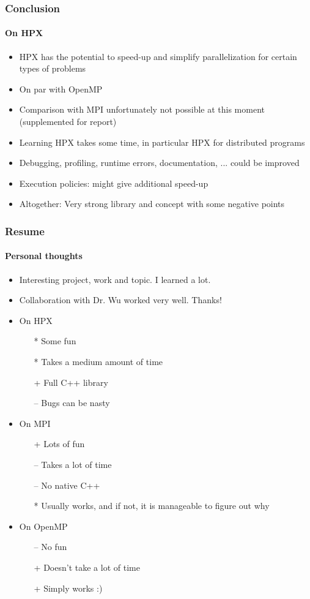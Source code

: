 \begin{frame}
\frametitle{Conclusion}
\framesubtitle{On HPX}
\begin{itemize}
 \item HPX has the potential to speed-up and simplify parallelization for certain types of problems
 \item On par with OpenMP
 \item Comparison with MPI unfortunately not possible at this moment (supplemented for report)
 \item Learning HPX takes some time, in particular HPX for distributed programs
 \item Debugging, profiling, runtime errors, documentation, ...  could be improved
 \item Execution policies: might give additional speed-up
 \item Altogether: Very strong library and concept with some negative points
\end{itemize}
\end{frame}

\begin{frame}
\frametitle{Resume}
\framesubtitle{Personal thoughts}
\begin{itemize}
 \item Interesting project, work and topic. I learned a lot.
 \item Collaboration with Dr. Wu worked very well. Thanks!
 \item On HPX
       \begin{itemize}
        \item[*] Some fun
        \item[*] Takes a medium amount of time
        \item[+] Full C++ library
        \item[--] Bugs can be nasty
       \end{itemize}
 \item On MPI
       \begin{itemize}
        \item[+] Lots of fun
        \item[--] Takes a lot of time
        \item[--] No native C++
        \item[*] Usually works, and if not, it is manageable to figure out why
       \end{itemize}
 \item On OpenMP
       \begin{itemize}
        \item[--] No fun
        \item[+] Doesn't take a lot of time
        \item[+] Simply works :)
       \end{itemize}
\end{itemize}
\end{frame}



